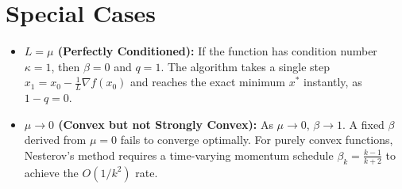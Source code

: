 \documentclass[11pt]{article}
\begin{document}
\section*{Special Cases}
\begin{itemize}
    \item \textbf{$L = \mu$ (Perfectly Conditioned):} If the function has condition number $\kappa = 1$, then $\beta = 0$ and $q = 1$. The algorithm takes a single step $x_1 = x_0 - \frac{1}{L}\nabla f(x_0)$ and reaches the exact minimum $x^*$ instantly, as $1 - q = 0$.
    \item \textbf{$\mu \to 0$ (Convex but not Strongly Convex):} As $\mu \to 0$, $\beta \to 1$. A fixed $\beta$ derived from $\mu=0$ fails to converge optimally. For purely convex functions, Nesterov's method requires a time-varying momentum schedule $\beta_k = \frac{k-1}{k+2}$ to achieve the $O(1/k^2)$ rate.
\end{itemize}
\end{document}
